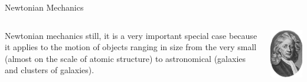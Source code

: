 \documentclass[18pt]{LectMechanics}
\begin{document}
\begin{frame}{Newtonian Mechanics}{}
\begin{columns}
\begin{column}[t]{0.7\linewidth}
{				Newtonian mechanics still, it is a very important special case because it applies
				to the motion of objects ranging in size from the very small (almost on the scale of
				atomic structure) to astronomical (galaxies and clusters of galaxies).
			}
		\end{column}
		\begin{column}[t]{0.3\linewidth}
			\begin{center}
				\includegraphics[width=1\linewidth]{Newton}
			\end{center}
		\end{column}
	\end{columns}

\end{frame}
\end{document}
